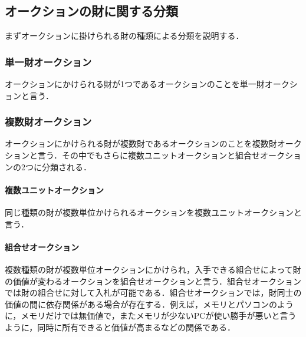 \hypertarget{ux30aaux30fcux30afux30b7ux30e7ux30f3ux306eux8ca1ux306bux95a2ux3059ux308bux5206ux985e}{%
\subsection{オークションの財に関する分類}\label{ux30aaux30fcux30afux30b7ux30e7ux30f3ux306eux8ca1ux306bux95a2ux3059ux308bux5206ux985e}}

まずオークションに掛けられる財の種類による分類を説明する．

\hypertarget{ux5358ux4e00ux8ca1ux30aaux30fcux30afux30b7ux30e7ux30f3}{%
\subsubsection{単一財オークション}\label{ux5358ux4e00ux8ca1ux30aaux30fcux30afux30b7ux30e7ux30f3}}

オークションにかけられる財が1つであるオークションのことを単一財オークションと言う．

\hypertarget{ux8907ux6570ux8ca1ux30aaux30fcux30afux30b7ux30e7ux30f3}{%
\subsubsection{複数財オークション}\label{ux8907ux6570ux8ca1ux30aaux30fcux30afux30b7ux30e7ux30f3}}

オークションにかけられる財が複数財であるオークションのことを複数財オークションと言う．その中でもさらに複数ユニットオークションと組合せオークションの2つに分類される．

\hypertarget{ux8907ux6570ux30e6ux30cbux30c3ux30c8ux30aaux30fcux30afux30b7ux30e7ux30f3}{%
\paragraph{複数ユニットオークション}\label{ux8907ux6570ux30e6ux30cbux30c3ux30c8ux30aaux30fcux30afux30b7ux30e7ux30f3}}

同じ種類の財が複数単位かけられるオークションを複数ユニットオークションと言う．

\hypertarget{ux7d44ux5408ux305bux30aaux30fcux30afux30b7ux30e7ux30f3}{%
\paragraph{組合せオークション}\label{ux7d44ux5408ux305bux30aaux30fcux30afux30b7ux30e7ux30f3}}

複数種類の財が複数単位オークションにかけられ，入手できる組合せによって財の価値が変わるオークションを組合せオークションと言う．組合せオークションでは財の組合せに対して入札が可能である．組合せオークションでは，財同士の価値の間に依存関係がある場合が存在する．例えば，メモリとパソコンのように，メモリだけでは無価値で，またメモリが少ないPCが使い勝手が悪いと言うように，同時に所有できると価値が高まるなどの関係である．

